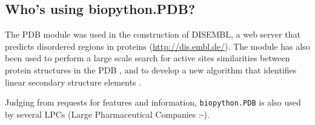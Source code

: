 \subsection{Who's using biopython.PDB?}

The PDB module was used in the construction of DISEMBL, a web server that
predicts disordered regions in proteins (\url{http://dis.embl.de/}). The module  has also been used to
perform a large scale search for active sites similarities between
protein structures in the PDB \cite[Hamelryck, 2003]{hamelryck2003b}, and to develop a new algorithm
that identifies linear secondary structure elements \cite[Majumdar \textit{et al.}, 2005]{majumdar2005}.

Judging from requests for features and information, \verb+biopython.PDB+ is also
used by several LPCs (Large Pharmaceutical Companies :-).


